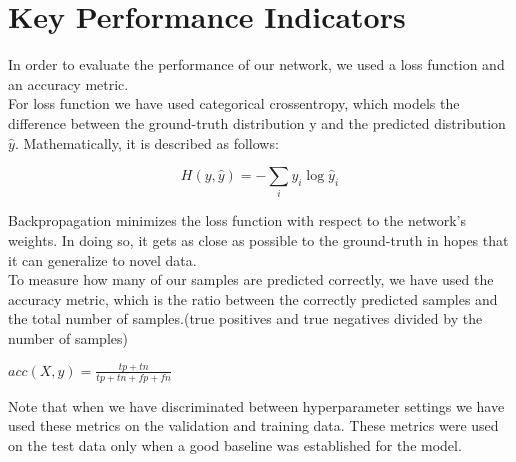 \section{Key Performance Indicators}
In order to evaluate the performance of our network, we used a loss function and an accuracy metric.\\
For loss function we have used categorical crossentropy, which models the difference between the ground-truth distribution y and the predicted distribution $\hat{y}$. Mathematically, it is described as follows:\\
\begin{center}
$$H(y,\hat{y}) = - \sum_i y_i \log \hat{y}_i$$
\end{center}
Backpropagation minimizes the loss function with respect to the network's weights. In doing so, it gets as close as possible to the ground-truth in hopes that it can generalize to novel data.\\
To measure how many of our samples are predicted correctly, we have used the accuracy metric, which is the ratio between the correctly predicted samples and the total number of samples.(true positives and true negatives divided by the number of samples)
\begin{center}
$acc(X,y) = \frac{tp+tn}{tp+tn+fp+fn}$
\end{center}
Note that when we have discriminated between hyperparameter settings we have used these metrics on the validation and training data. These metrics were used on the test data only when a good baseline was established for the model.
